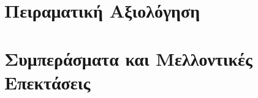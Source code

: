 \section{Πειραματική Αξιολόγηση}

\section{Συμπεράσματα και Μελλοντικές Επεκτάσεις}


\renewcommand{\thesection}{\thechapter.\arabic{section}}
